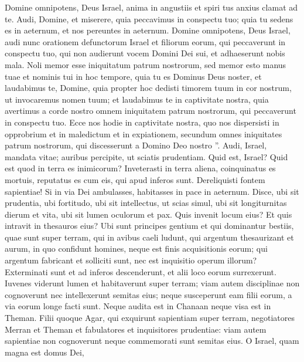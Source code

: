 \begin{biblechapter}
\begin{biblechapter}
\begin{biblechapter}
\verse Domine omnipotens, Deus Israel, anima in angustiis et spiri tus anxius clamat ad te. 
\verse Audi, Domine, et miserere, quia peccavimus in conspectu tuo; 
 \verse quia tu sedens es in aeternum, et nos pereuntes in aeternum. 
\verse Domine omnipotens, Deus Israel, audi nunc orationem defunctorum Israel et filiorum eorum, qui peccaverunt in conspectu tuo, qui non audierunt vocem Domini Dei sui, et adhaeserunt nobis mala. 
\verse Noli memor esse iniquitatum patrum nostrorum, sed memor esto manus tuae et nominis tui in hoc tempore, 
\verse quia tu es Dominus Deus noster, et laudabimus te, Domine, 
\verse quia propter hoc dedisti timorem tuum in cor nostrum, ut invocaremus nomen tuum; et laudabimus te in captivitate nostra, quia avertimus a corde nostro omnem iniquitatem patrum nostrorum, qui peccaverunt in conspectu tuo. 
\verse Ecce nos hodie in captivitate nostra, quo nos dispersisti in opprobrium et in maledictum et in expiationem, secundum omnes iniquitates patrum nostrorum, qui discesserunt a Domino Deo nostro ”.
 \verse Audi, Israel, mandata vitae;
 auribus percipite, ut sciatis prudentiam.
 \verse Quid est, Israel?
 Quid est quod in terra es inimicorum?
 \verse Inveterasti in terra aliena,
 coinquinatus es mortuis,
 reputatus es cum eis, qui apud inferos sunt.
 \verse Dereliquisti fontem sapientiae!
 \verse Si in via Dei ambulasses,
 habitasses in pace in aeternum.
 \verse Disce, ubi sit prudentia,
 ubi fortitudo, ubi sit intellectus,
 ut scias simul, ubi sit longiturnitas dierum et vita,
 ubi sit lumen oculorum et pax.
 \verse Quis invenit locum eius?
 Et quis intravit in thesauros eius?
 \verse Ubi sunt principes gentium
 et qui dominantur bestiis, quae sunt super terram,
 \verse qui in avibus caeli ludunt,
 \verse qui argentum thesaurizant et aurum,
 in quo confidunt homines,
 neque est finis acquisitionis eorum;
 qui argentum fabricant et solliciti sunt,
 nec est inquisitio operum illorum?
 \verse Exterminati sunt et ad inferos descenderunt,
 et alii loco eorum surrexerunt.
 \verse Iuvenes viderunt lumen et habitaverunt super terram;
 viam autem disciplinae non cognoverunt
 \verse nec intellexerunt semitas eius;
 neque susceperunt eam filii eorum,
 a via eorum longe facti sunt.
 \verse Neque audita est in Chanaan
 neque visa est in Theman.
 \verse Filii quoque Agar, qui exquirunt sapientiam super terram,
 negotiatores Merran et Theman
 et fabulatores et inquisitores prudentiae:
 viam autem sapientiae non cognoverunt
 neque commemorati sunt semitas eius.
 \verse O Israel, quam magna est domus Dei,

\end{biblechapter}
\end{biblechapter}
\end{biblechapter}
